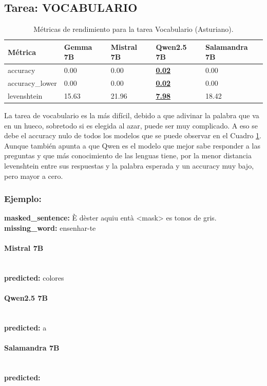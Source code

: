 \subsection{Tarea: VOCABULARIO}\label{tarea-vocabulario}
\begin{longtable}[]{@{}lllll@{}}
\toprule\noalign{}
Métrica & Gemma 7B & Mistral 7B & Qwen2.5 7B & Salamandra 7B \\
\midrule\noalign{}
\endhead
\bottomrule\noalign{}
\caption{Métricas de rendimiento para la tarea Vocabulario (Asturiano).}
\label{tab:metricas_vocabulario_Asturiano}
\endlastfoot
accuracy & 0.00 & 0.00 & \textbf{\underline{0.02}} & 0.00 \\
accuracy\_lower & 0.00 & 0.00 & \textbf{\underline{0.02}} & 0.00 \\
levenshtein & 15.63 & 21.96 & \textbf{\underline{7.98}} & 18.42 \\
\end{longtable}
La tarea de vocabulario es la más difícil, debido a que adivinar la palabra que va en un hueco, sobretodo si es elegida al azar, puede ser muy complicado. A eso se debe el accuracy nulo de todos los modelos que se puede observar en el Cuadro \ref{tab:metricas_vocabulario_Asturiano}. Aunque también apunta a que Qwen es el modelo que mejor sabe responder a las preguntas y que más conocimiento de las lenguas tiene, por la menor distancia levenshtein entre sus respuestas y la palabra esperada y un accuracy muy bajo, pero mayor a cero.  

\subsubsection{Ejemplo:}
\textbf{masked\_sentence:} È d\textquotesingle{}èster aquiu entà {\textless}mask{\textgreater} es tonos de gris.\\
\textbf{missing\_word:} ensenhar-te

\paragraph{Mistral 7B}~\\
\textbf{predicted:} colores

\paragraph{Qwen2.5 7B}~\\
\textbf{predicted:} a

\paragraph{Salamandra 7B}~\\
\textbf{predicted:} 

